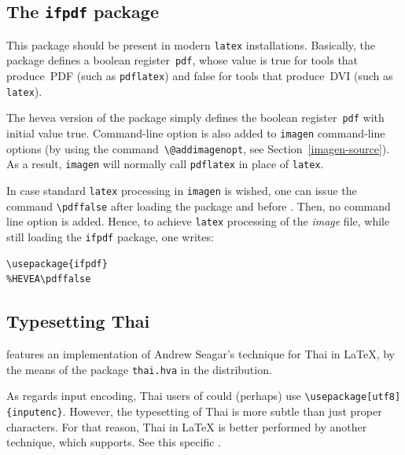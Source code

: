\subsection{The \texttt{ifpdf} package}
This package should be present in modern \texttt{latex} installations.
Basically, the package defines a boolean register~\texttt{pdf}, whose
value is true for tools that produce~\textsc{PDF} (such as
\texttt{pdflatex}) and false for tools that produce~\textsc{DVI}
(such as \texttt{latex}).

The hevea version of the package simply defines the boolean
register~\texttt{pdf} with initial value true.  Command-line option
  is also added to \texttt{imagen} command-line
options (by using the command~\verb+\@addimagenopt+, see
Section~\ref{imagen-source}).  As a result, \texttt{imagen} will
normally call \texttt{pdflatex} in place of \texttt{latex}.

In case standard \texttt{latex} processing in \texttt{imagen} is
wished, one can issue the command \verb+\pdffalse+ after loading the
 package and before \verb++. Then, no
command line option is added.
Hence, to achieve \texttt{latex} processing of the \textit{image}
file, while still loading the \texttt{ifpdf} package, one writes:
\begin{verbatim}
\usepackage{ifpdf}
%HEVEA\pdffalse
\end{verbatim}

\subsection{Typesetting Thai}
%
\hevea{} features an implementation of Andrew Seagar's technique
for Thai in \LaTeX{},
by the means of the package \texttt{thai.hva} in the distribution.

As regards input encoding, Thai users of \hevea{} could (perhaps) use
\verb+\usepackage[utf8]{inputenc}+.
However, the typesetting of Thai is more subtle than just proper
characters.  For that reason, Thai in \LaTeX{} is better performed by
another technique, which \hevea{} supports.  See this specific
.

